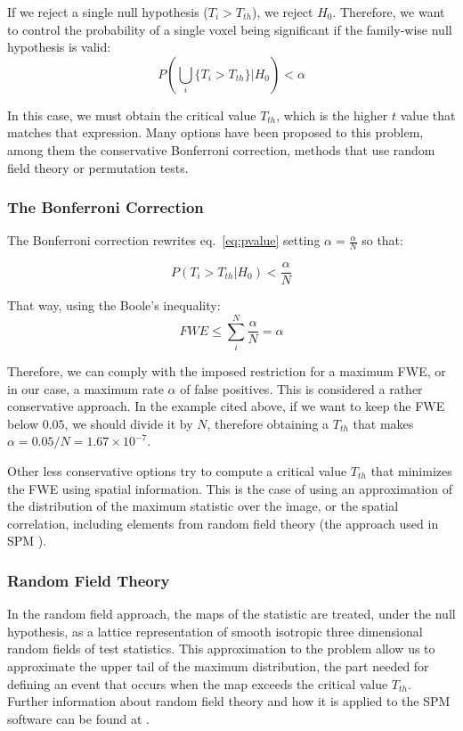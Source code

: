If we reject a single null hypothesis ($T_i > T_{th}$), we reject $H_0$. Therefore, we want to control the probability of a single voxel being significant if the family-wise null hypothesis is valid:
\begin{equation}
P \left(\bigcup_i\{T_i > T_{th}\} | H_0\right)< \alpha
\end{equation}

In this case, we must obtain the critical value $T_{th}$, which is the higher $t$ value that matches that expression. Many options have been proposed to this problem, among them the conservative Bonferroni correction, methods that use random field theory or permutation tests. 

\subsubsection{The Bonferroni Correction}
The Bonferroni correction \cite{Shaffer1995} rewrites eq.~\ref{eq:pvalue} setting $\alpha=\frac{\alpha}{N}$ so that: 

\begin{equation}
P \left(T_i > T_{th}| H_0\right)< \frac{\alpha}{N}
\end{equation}

That way, using the Boole's inequality:
\begin{equation}
FWE \leq \sum_{i}^{N} \frac{\alpha}{N} = \alpha
\end{equation}

Therefore, we can comply with the imposed restriction for a maximum \ac{FWE}, or in our case, a maximum rate $\alpha$ of false positives. This is considered a rather conservative approach. In the example cited above, if we want to keep the \ac{FWE} below $0.05$, we should divide it by $N$, therefore obtaining a $T_{th}$ that makes $\alpha = 0.05/N = 1.67\times10^{-7}$. 

Other less conservative options try to compute a critical value $T_{th}$ that minimizes the \ac{FWE} using spatial information. This is the case of using an approximation of the distribution of the maximum statistic over the image, or the spatial correlation, including elements from random field theory (the approach used in \ac{SPM} \cite{spm_book}). 

\subsubsection{Random Field Theory}
In the random field approach, the maps of the statistic are treated, under the null hypothesis, as a lattice representation of smooth isotropic three dimensional random fields of test statistics. This approximation to the problem allow us to approximate the upper tail of the maximum distribution, the part needed for defining an event that occurs when the map exceeds the critical value $T_{th}$. Further information about random field theory and how it is applied to the \ac{SPM} software can be found at \cite{spm_book}. 

